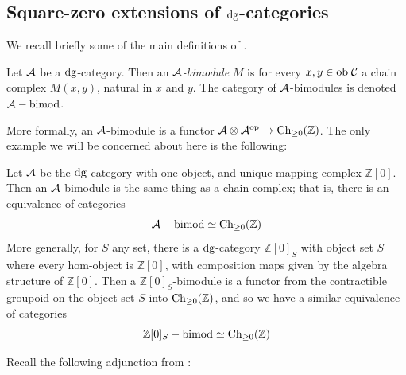 \documentclass[12pt]{amsart}
\begin{document}
\subsection{Square-zero extensions of $\mathrm{dg}$-categories} 
We recall briefly some of the main definitions of \cite{Tabuada2009}.
\begin{definition}
	Let $\mathcal{A}$ be a $\mathrm{dg}$-category. Then an \emph{$\mathcal{A}$-bimodule} $M$ is for every $x,y \in {\mathrm{ob}\;} \mathcal{C}$ a chain complex $M(x,y)$, natural in $x$ and $y$.
	The category of $\mathcal{A}$-bimodules is denoted $\mathcal{A}-\mathrm{bimod}$.
\end{definition}
More formally, an $\mathcal{A}$-bimodule is a functor $\mathcal{A} \otimes \mathcal{A}^{\mathrm{op}} \to \mathrm{Ch}_{\ge 0}(\mathbb{Z})$.
The only example we will be concerned about here is the following:
\begin{example}
	Let $\mathcal{A}$ be the $\mathrm{dg}$-category with one object, and unique mapping complex $\mathbb{Z}[0]$. Then an $\mathcal{A}$ bimodule is the same thing as a chain complex; that is, there is an equivalence of categories
	$$\mathcal{A}-\mathrm{bimod} \simeq \mathrm{Ch}_{\ge 0}(\mathbb{Z})$$
	More generally, for $S$ any set, there is a $\mathrm{dg}$-category $\mathbb{Z}[0]_S$ with object set $S$ where every hom-object is $\mathbb{Z}[0]$, with composition maps given by the algebra structure of $\mathbb{Z}[0]$. 
	Then a $\mathbb{Z}[0]_S$-bimodule is a functor from the contractible groupoid on the object set $S$ into $\mathrm{Ch}_{\ge 0}(\mathbb{Z})$, and so we have a similar equivalence of categories 
	$$\mathbb{Z}[0]_S-\mathrm{bimod} \simeq \mathrm{Ch}_{\ge 0}(\mathbb{Z})$$
\end{example}
Recall the following adjunction from \cite[Section 5]{Tabuada2009}:
\end{document}
